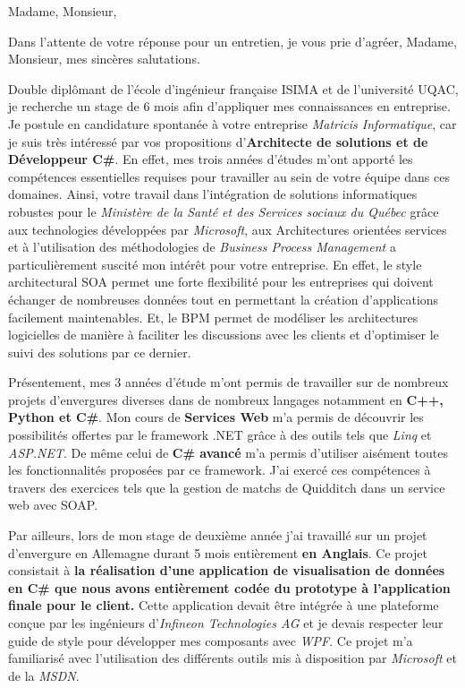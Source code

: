 \date{\today}
\opening{Madame, Monsieur,}
\closing{Dans l'attente de votre réponse pour un entretien, je vous prie d'agréer, Madame, Monsieur, mes sincères salutations.}

\makelettertitle

Double diplômant de l'école d'ingénieur française ISIMA et de l'université UQAC, je recherche un stage de 6 mois afin d'appliquer mes connaissances en entreprise. Je postule en candidature spontanée à votre entreprise \textit{Matricis Informatique}, car je suis très intéressé par vos propositions d'\textbf{Architecte de solutions et de Développeur C\#}. En effet, mes trois années d'études m'ont apporté les compétences essentielles requises pour travailler au sein de votre équipe dans ces domaines. Ainsi, votre travail dans l'intégration de solutions informatiques robustes pour le  \textit{Ministère de la Santé et des Services sociaux du Québec} grâce aux technologies développées par \textit{Microsoft}, aux Architectures orientées services et à l'utilisation des méthodologies de \textit{Business Process Management} a particulièrement suscité mon intérêt pour votre entreprise. En effet, le style architectural SOA permet une forte flexibilité pour les entreprises qui doivent échanger de nombreuses données tout en permettant la création d'applications facilement maintenables. Et, le BPM permet de modéliser les architectures logicielles de manière à faciliter les discussions avec les clients et d'optimiser le suivi des solutions par ce dernier.

Présentement, mes 3 années d'étude m'ont permis de travailler sur de nombreux projets d'envergures diverses dans de nombreux langages notamment en \textbf{C++, Python et C\#}. Mon cours de \textbf{Services Web} m'a permis de découvrir les possibilités offertes par le framework .NET grâce à des outils tels que \textit{Linq} et \textit{ASP.NET}.  De même celui de \textbf{C\# avancé} m’a permis d'utiliser aisément toutes les fonctionnalités proposées par ce framework. J'ai exercé ces compétences à travers des exercices tels que la gestion de matchs de Quidditch dans un service web avec SOAP.

Par ailleurs, lors de mon stage de deuxième année j'ai travaillé sur un projet d'envergure en Allemagne durant 5 mois entièrement \textbf{en Anglais}. Ce projet consistait à \textbf{la réalisation d'une application de visualisation de données en C\# que nous avons entièrement codée du prototype à l'application finale pour le client.} Cette application devait être intégrée à une plateforme conçue par les ingénieurs d'\textit{Infineon Technologies AG} et je devais respecter leur guide de style pour développer mes composants avec \textit{WPF}. Ce projet m'a familiarisé avec l'utilisation des différents outils mis à disposition par \textit{Microsoft} et de la \textit{MSDN}.

